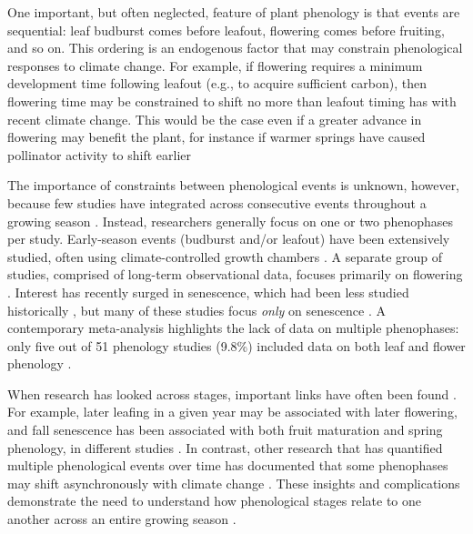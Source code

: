 \documentclass{article}
\begin{document}
\par One important, but often neglected, feature of plant phenology is that events are sequential: leaf budburst comes before leafout, flowering comes before fruiting, and so on. This ordering is an endogenous factor that may constrain phenological responses to climate change. For example, if flowering requires a minimum development time following leafout (e.g., to acquire sufficient carbon), then flowering time may be constrained to shift no more than leafout timing has with recent climate change. This would be the case even if a greater advance in flowering may benefit the plant, for instance if warmer springs have caused pollinator activity to shift earlier \citep{polgar2013, thackeray2010}

\par The importance of constraints between phenological events is unknown, however, because few studies have integrated across consecutive events throughout a growing season \citep{wolkovich2014}. Instead, researchers generally focus on one or two phenophases per study. Early-season events (budburst and/or leafout) have been extensively studied, often using climate-controlled growth chambers \citep[e.g.,][]{basler2012,laube2014}. A separate group of studies, comprised of long-term observational data, focuses primarily on flowering \citep[e.g.,] []{fitter2002,millerrushing2008}. Interest has recently surged in senescence, which had been less studied historically \citep {parmesan2006}, but many of these studies focus \textit{only} on senescence \citep[e.g.,][]{taylor2008,archetti2013,jeong2014}. A contemporary meta-analysis highlights the lack of data on multiple phenophases: only five out of 51 phenology studies (9.8\%) included data on both leaf and flower phenology \citep{wolkovich2012}. 

\par When research has looked across stages, important links have often been found \citep{li2016}. For example, later leafing in a given year may be associated with later flowering, and fall senescence has been associated with both fruit maturation and spring phenology, in different studies \citep{lechowicz1995,keenan2015,liu2016}. In contrast, other research that has quantified multiple phenological events over time has documented that some phenophases may shift asynchronously with climate change \citep[e.g., spring events are occurring earlier as fall events have gotten later, first-flower dates have shifted earlier whereas last-flower dates have not,][]{menzel2006,caradonna2014}. These insights and complications demonstrate the need to understand how phenological stages relate to one another across an entire growing season \citep{wolkovich2014}.
\end{document}
